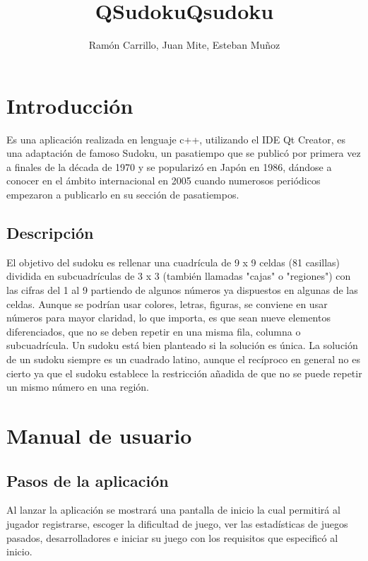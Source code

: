 \documentclass[a4paper,11pt]{article}
\title{QSudoku}
\title{Qsudoku}
\author{Ramón Carrillo, Juan Mite, Esteban Muñoz}
\begin{document}
\maketitle
\tableofcontents

\section{Introducción}
Es una aplicación realizada en lenguaje c++, utilizando el IDE Qt Creator, es una adaptación de famoso Sudoku, un pasatiempo que se publicó por primera vez a finales de la década de 1970 y se popularizó en Japón en 1986, dándose a conocer en el ámbito internacional en 2005 cuando numerosos periódicos empezaron a publicarlo en su sección de pasatiempos.

\subsection{Descripción}
El objetivo del sudoku es rellenar una cuadrícula de 9 x 9 celdas (81 casillas) dividida en subcuadrículas de 3 x 3 (también llamadas "cajas" o "regiones") con las cifras del 1 al 9 partiendo de algunos números ya dispuestos en algunas de las celdas. Aunque se podrían usar colores, letras, figuras, se conviene en usar números para mayor claridad, lo que importa, es que sean nueve elementos diferenciados, que no se deben repetir en una misma fila, columna o subcuadrícula. Un sudoku está bien planteado si la solución es única. La solución de un sudoku siempre es un cuadrado latino, aunque el recíproco en general no es cierto ya que el sudoku establece la restricción añadida de que no se puede repetir un mismo número en una región. 

\section{Manual de usuario} 


\subsection{Pasos de la aplicación}
Al lanzar la aplicación se mostrará una pantalla de inicio la cual permitirá al jugador registrarse, escoger la dificultad de juego, ver las estadísticas de juegos pasados, desarrolladores e iniciar su juego con los requisitos que especificó al inicio.
\end{document}
